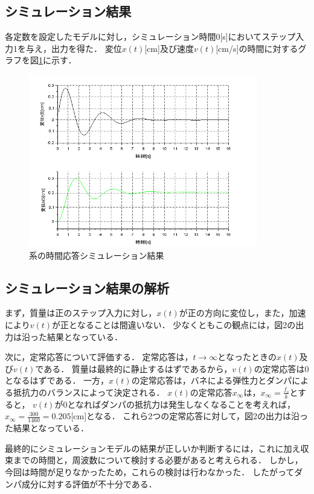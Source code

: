 \documentclass[dvipdfmx,titlepage,a4j]{jsarticle}  %
\begin{document}
\subsection{シミュレーション結果}
各定数を設定したモデルに対し，シミュレーション時間0[s]においてステップ入力1を与え，出力を得た．
変位$x(t)$[cm]及び速度$v(t)$[cm/s]の時間に対するグラフを図\ref{fig:bane-graph.png}に示す．

\begin{figure}[H]
  \centering
  \includegraphics[width=10cm]{../graph/bane-graph.png}
  \caption{系の時間応答シミュレーション結果}
  \label{fig:bane-graph.png}
\end{figure}

\subsection{シミュレーション結果の解析}
まず，質量は正のステップ入力に対し，$x(t)$が正の方向に変位し，また，加速により$v(t)$が正となることは間違いない．
少なくともこの観点には，図2の出力は沿った結果となっている．

次に，定常応答について評価する．
定常応答は，$t \rightarrow \infty$となったときの$x(t)$及び$v(t)$である．
質量は最終的に静止するはずであるから，$v(t)$の定常応答は0となるはずである．
一方，$x(t)$の定常応答は，バネによる弾性力とダンパによる抵抗力のバランスによって決定される．
$x(t)$の定常応答$x_\infty$は，$x_\infty = \frac{f_o}{k}$とすると，
$v(t)$が0となればダンパの抵抗力は発生しなくなることを考えれば，$x_\infty = \frac{300}{1460} = 0.205$[cm]となる．
これら2つの定常応答に対して，図2の出力は沿った結果となっている．

最終的にシミュレーションモデルの結果が正しいか判断するには，これに加え収束までの時間と，周波数について検討する必要があると考えられる．
しかし，今回は時間が足りなかったため，これらの検討は行わなかった．
したがってダンパ成分に対する評価が不十分である．
\end{document}
